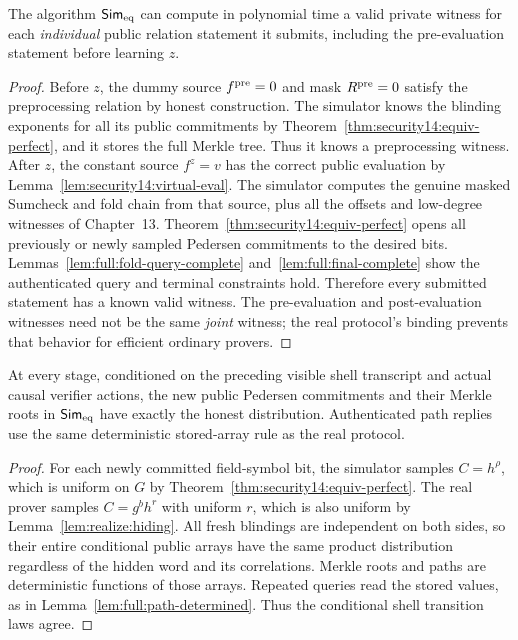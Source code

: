 \begin{lemma}\label{lem:security14:sim-witnesses}
The algorithm
$\mathsf{Sim}_{\rm eq}$
can compute in polynomial
time a valid private
witness for each
\emph{individual}
public relation statement
it submits, including the
pre-evaluation statement
before learning $z$.
\end{lemma}
\begin{proof}
Before $z$, the dummy
source $f^{\rm pre}=0$
and mask $R^{\rm pre}=0$
satisfy the preprocessing
relation by honest
construction. The simulator
knows the blinding
exponents for all its
public commitments by
Theorem~\ref{thm:security14:equiv-perfect},
and it stores the full
Merkle tree. Thus it knows
a preprocessing witness.
After $z$, the constant
source $f^z=v$ has the
correct public evaluation
by Lemma~\ref{lem:security14:virtual-eval}.
The simulator computes the
genuine masked Sumcheck
and fold chain from that
source, plus all the
offsets and low-degree
witnesses of Chapter~13.
Theorem~\ref{thm:security14:equiv-perfect}
opens all previously or newly
sampled Pedersen commitments
to the desired bits.
Lemmas~\ref{lem:full:fold-query-complete}
and~\ref{lem:full:final-complete}
show the authenticated query
and terminal constraints hold.
Therefore every submitted
statement has a known
valid witness.
The pre-evaluation and
post-evaluation witnesses
need not be the same
\emph{joint} witness;
the real protocol's
binding prevents that
behavior for efficient
ordinary provers.
\end{proof}

\begin{lemma}\label{lem:security14:eq-shell-law}
At every stage, conditioned
on the preceding visible
shell transcript and actual
causal verifier actions,
the new public Pedersen
commitments and their Merkle
roots in $\mathsf{Sim}_{\rm eq}$
have exactly the honest
distribution. Authenticated
path replies use the same
deterministic stored-array
rule as the real protocol.
\end{lemma}
\begin{proof}
For each newly committed
field-symbol bit, the
simulator samples
$C=h^\rho$, which is
uniform on $G$ by
Theorem~\ref{thm:security14:equiv-perfect}.
The real prover samples
$C=g^b h^r$ with uniform
$r$, which is also
uniform by
Lemma~\ref{lem:realize:hiding}.
All fresh blindings are
independent on both sides,
so their entire conditional
public arrays have the
same product distribution
regardless of the hidden
word and its correlations.
Merkle roots and paths
are deterministic functions
of those arrays.
Repeated queries read the
stored values, as in
Lemma~\ref{lem:full:path-determined}.
Thus the conditional shell
transition laws agree.
\end{proof}


